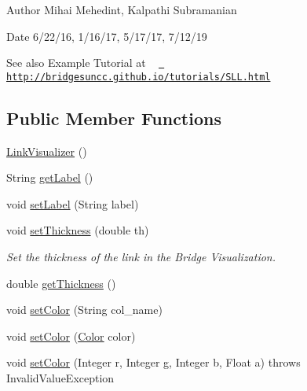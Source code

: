 \begin{DoxyAuthor}{Author}
Mihai Mehedint, Kalpathi Subramanian
\end{DoxyAuthor}
\begin{DoxyDate}{Date}
6/22/16, 1/16/17, 5/17/17, 7/12/19
\end{DoxyDate}
\begin{DoxySeeAlso}{See also}
Example Tutorial at ~\newline
 \href{http://bridgesuncc.github.io/tutorials/SLL.html}{\texttt{ http\+://bridgesuncc.\+github.\+io/tutorials/\+S\+L\+L.\+html}} 
\end{DoxySeeAlso}
\subsection*{Public Member Functions}
\begin{DoxyCompactItemize}
\item 
\mbox{\hyperlink{classbridges_1_1base_1_1_link_visualizer_a0b69f099fa264ae9097b0efe278c6a1b}{Link\+Visualizer}} ()
\item 
String \mbox{\hyperlink{classbridges_1_1base_1_1_link_visualizer_a9ed60a0f8a337cd2c98b2d6ab07b8601}{get\+Label}} ()
\item 
void \mbox{\hyperlink{classbridges_1_1base_1_1_link_visualizer_a073d84e04dd95c3848c9f4e0ad74eb77}{set\+Label}} (String label)
\item 
void \mbox{\hyperlink{classbridges_1_1base_1_1_link_visualizer_a702e9ca345d1a4a035baf2041f275849}{set\+Thickness}} (double th)
\begin{DoxyCompactList}\small\item\em Set the thickness of the link in the Bridge Visualization. \end{DoxyCompactList}\item 
double \mbox{\hyperlink{classbridges_1_1base_1_1_link_visualizer_af1592d2a8664b00c1a51fdc0f8d1860a}{get\+Thickness}} ()
\item 
void \mbox{\hyperlink{classbridges_1_1base_1_1_link_visualizer_a92f306dbd73b961befa8ab4c0620a89e}{set\+Color}} (String col\+\_\+name)
\item 
void \mbox{\hyperlink{classbridges_1_1base_1_1_link_visualizer_ab05a7576f99818937276a4937eedeee1}{set\+Color}} (\mbox{\hyperlink{classbridges_1_1base_1_1_color}{Color}} color)
\item 
void \mbox{\hyperlink{classbridges_1_1base_1_1_link_visualizer_a003905cfe33e1704555b2b3a1cf99bad}{set\+Color}} (Integer r, Integer g, Integer b, Float a)  throws Invalid\+Value\+Exception 

\end{DoxyCompactItemize}
